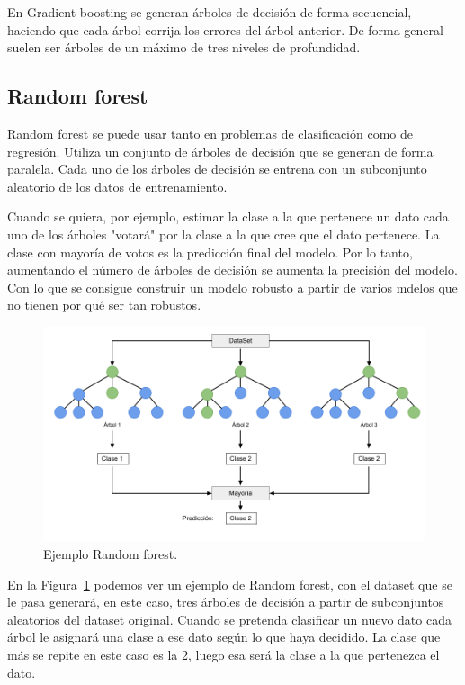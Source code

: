 \documentclass[a4paper, 12pt]{book}
\begin{document}
En Gradient boosting se generan árboles de decisión de forma secuencial, haciendo que cada árbol corrija los errores del árbol anterior. De forma general suelen ser árboles de un máximo de tres niveles de profundidad.

\subsection{Random forest}
\label{subsec:random_forest}

Random forest se puede usar tanto en problemas de clasificación como de regresión. Utiliza un conjunto de árboles de decisión que se generan de forma paralela. Cada uno de los árboles de decisión se entrena con un subconjunto aleatorio de los datos de entrenamiento. 

Cuando se quiera, por ejemplo, estimar la clase a la que pertenece un dato cada uno de los árboles "votará" por la clase a la que cree que el dato pertenece. La clase con mayoría de votos es la predicción final del modelo. Por lo tanto, aumentando el número de árboles de decisión se aumenta la precisión del modelo. Con lo que se consigue construir un modelo robusto a partir de varios mdelos que no tienen por qué ser tan robustos.

\begin{figure}[]
  \centering
  \includegraphics[width=14cm, keepaspectratio]{img/ejemplo_randomForest.png}
  \caption{Ejemplo Random forest.}\label{fig:ejemplo_rforest}
\end{figure}

En la Figura~\ref{fig:ejemplo_rforest} podemos ver un ejemplo de Random forest, con el dataset que se le pasa generará, en este caso, tres árboles de decisión a partir de subconjuntos aleatorios del dataset original. Cuando se pretenda clasificar un nuevo dato cada árbol le asignará una clase a ese dato según lo que haya decidido. La clase que más se repite en este caso es la 2, luego esa será la clase a la que pertenezca el dato.
\end{document}
